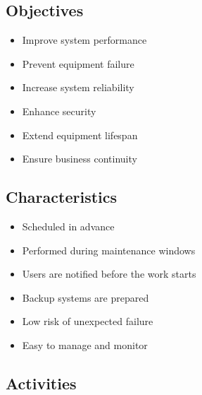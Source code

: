 \documentclass[11pt,a4paper]{article}
\begin{document}


\subsection{Objectives}

\begin{itemize}\itemsep2pt
  \item Improve system performance
  \item Prevent equipment failure
  \item Increase system reliability
  \item Enhance security
  \item Extend equipment lifespan
  \item Ensure business continuity
\end{itemize}

\subsection{Characteristics}

\begin{itemize}\itemsep2pt
  \item Scheduled in advance
  \item Performed during maintenance windows
  \item Users are notified before the work starts
  \item Backup systems are prepared
  \item Low risk of unexpected failure
  \item Easy to manage and monitor
\end{itemize}

\subsection{Activities}
\end{document}
